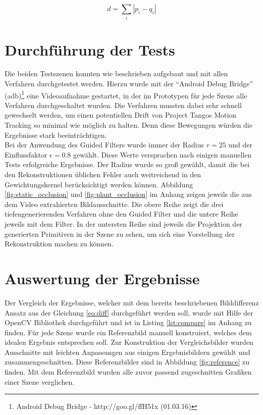 \begin{equation} \label{eq:diff}
d = \sum_i |p_i-q_i|
\end{equation}

\section{Durchführung der Tests}

Die beiden Testszenen konnten wie beschrieben aufgebaut und mit allen Verfahren durchgetestet werden. Hierzu wurde mit der \enquote{Android Debug Bridge} (adb)\footnote{Android Debug Bridge - http://goo.gl/ffH51x (01.03.16)} eine Videoaufnahme gestartet, in der im Prototypen für jede Szene alle Verfahren durchgeschaltet wurden. Die Verfahren mussten dabei sehr schnell gewechselt werden, um einen potentiellen Drift von Project Tangos Motion Tracking so minimal wie möglich zu halten. Denn diese Bewegungen würden die Ergebnisse stark beeinträchtigen. \\

Bei der Anwendung des Guided Filters wurde immer der Radius \(r = 25\) und der Einflussfaktor \(\epsilon = 0.8\) gewählt. Diese Werte versprachen nach einigen manuellen Tests erfolgreiche Ergebnisse. Der Radius wurde so groß gewählt, damit die bei den Rekonstruktionen üblichen Fehler auch weitreichend in den Gewichtungskernel berücksichtigt werden können. Abbildung \ref{fig:static_occlusion} und \ref{fig:plant_occlusion} im Anhang zeigen jeweils die aus dem Video extrahierten Bildausschnitte. Die obere Reihe zeigt die drei tiefengenerierenden Verfahren ohne den Guided Filter und die untere Reihe jeweils mit dem Filter. In der untersten Reihe sind jeweils die Projektion der generierten Primitiven in der Szene zu sehen, um sich eine Vorstellung der Rekonstruktion machen zu können.

\section{Auswertung der Ergebnisse}

Der Vergleich der Ergebnisse, welcher mit dem bereits beschriebenen Bilddifferenz Ansatz aus der Gleichung \ref{eq:diff} durchgeführt werden soll, wurde mit Hilfe der OpenCV Bibliothek durchgeführt und ist in Listing \ref{lst:compare} im Anhang zu finden. Für jede Szene wurde ein Referenzbild manuell konstruiert, welches dem idealen Ergebnis entsprechen soll. Zur Konstruktion der Vergleichsbilder wurden Ausschnitte  mit leichten Anpassungen aus einigen Ergebnisbildern gewählt und zusammengeschnitten. Diese Referenzbilder sind in Abbildung \ref{fig:reference} zu finden. Mit dem Referenzbild wurden alle zuvor passend zugeschnitten Grafiken einer Szene verglichen. \\

